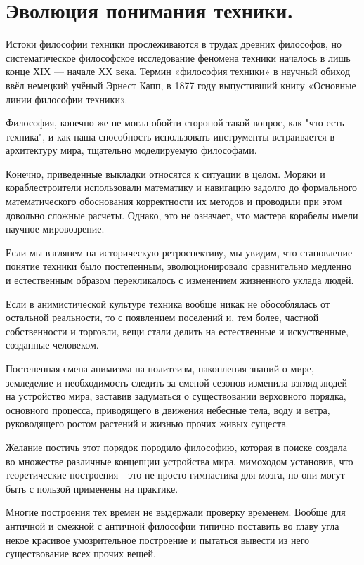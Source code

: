 \documentclass[a4paper]{article}
\begin{document}
{\section{Эволюция понимания техники.}

Истоки философии техники прослеживаются в трудах древних философов, но систематическое философское исследование феномена техники началось в лишь конце ХIХ — начале ХХ века. Термин «философия техники» в научный обиход ввёл немецкий учёный Эрнест Капп, в 1877 году выпустивший книгу «Основные линии философии техники».

Философия, конечно же не могла обойти стороной такой вопрос, как "что есть техника", и как наша способность использовать инструменты встраивается в архитектуру мира, тщательно моделируемую философами.

Конечно, приведенные выкладки относятся к ситуации в целом. Моряки и кораблестроители использовали математику и навигацию задолго до формального математического обоснования корректности их методов и проводили при этом довольно сложные расчеты. Однако, это не означает, что мастера корабелы имели научное мировозрение.

Если мы взглянем на историческую ретроспективу, мы увидим, что становление понятие техники было постепенным, эволюционировало сравнительно медленно и естественным образом перекликалось с изменением жизненного уклада людей.

Если в анимистической культуре техника вообще никак не обособлялась от остальной реальности, то с появлением поселений и, тем более, частной собственности и торговли, вещи стали делить на естественные и искуственные, созданные человеком.

Постепенная смена анимизма на политеизм, накопления знаний о мире, земледелие и необходимость следить за сменой сезонов изменила взгляд людей на устройство мира, заставив задуматься о существовании верховного порядка, основного процесса, приводящего в движения небесные тела, воду и ветра, руководящего ростом растений и жизнью прочих живых существ.

Желание постичь этот порядок породило философию, которая в поиске создала во множестве различные концепции устройства мира, мимоходом установив, что теоретические построения - это не просто гимнастика для мозга, но они могут быть с пользой применены на практике. 

Многие построения тех времен не выдержали проверку временем. Вообще для античной и смежной с античной философии типично поставить во главу угла некое красивое умозрительное построение и пытаться вывести из него существование всех прочих вещей.

}
\end{document}
